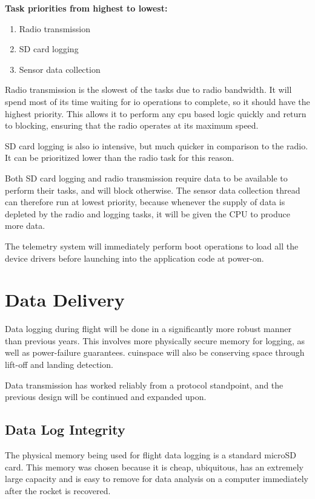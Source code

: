 \textbf{Task priorities from highest to lowest:}

\begin{enumerate}
    \item Radio transmission
    \item SD card logging
    \item Sensor data collection
\end{enumerate}

Radio transmission is the slowest of the tasks due to radio bandwidth. It will spend most of its time waiting for
\gls{io} operations to complete, so it should have the highest priority. This allows it to perform any \gls{cpu} based
logic quickly and return to blocking, ensuring that the radio operates at its maximum speed.

SD card logging is also \gls{io} intensive, but much quicker in comparison to the radio. It can be prioritized lower
than the radio task for this reason.

Both SD card logging and radio transmission require data to be available to perform their tasks, and will block
otherwise. The sensor data collection thread can therefore run at lowest priority, because whenever the supply of data
is depleted by the radio and logging tasks, it will be given the CPU to produce more data.

The telemetry system will immediately perform boot operations to load all the device drivers before launching into the
application code at power-on.

\section{Data Delivery}

Data logging during flight will be done in a significantly more robust manner than previous years. This involves more
physically secure memory for logging, as well as power-failure guarantees. \Gls{cuinspace} will also be conserving
space through lift-off and landing detection.

Data transmission has worked reliably from a protocol standpoint, and the previous design will be continued and
expanded upon.

\subsection{Data Log Integrity}

The physical memory being used for flight data logging is a standard microSD card. This memory was chosen because it is
cheap, ubiquitous, has an extremely large capacity and is easy to remove for data analysis on a computer immediately
after the rocket is recovered.

